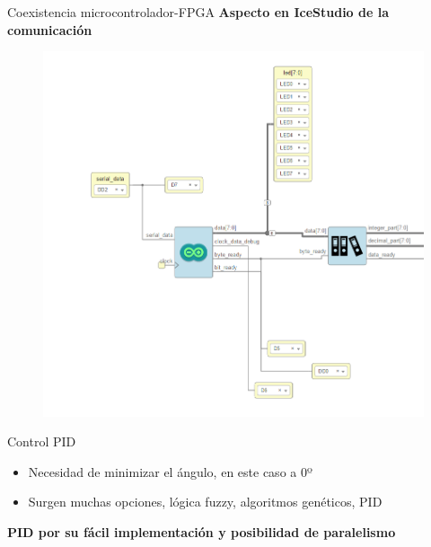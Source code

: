 \documentclass{beamer}
\begin{document}
\begin{frame}{Coexistencia microcontrolador-FPGA}
\centering \textbf{Aspecto en IceStudio de la comunicación}
\begin{figure}[H]
	\center
	\includegraphics[scale=0.3]{imagenes/Balancing_robot/arduino_arrange.PNG}
\end{figure}
\end{frame}





\begin{frame}{Control PID}
\begin{block}{}
	\begin{itemize}
		\item Necesidad de minimizar el ángulo, en este caso a 0º \pause
		\item Surgen muchas opciones, lógica fuzzy, algoritmos genéticos, PID \pause
	\end{itemize}
\end{block}
\begin{alertblock}
	\centering \textbf{PID por su fácil implementación y posibilidad de paralelismo}
\end{alertblock}
\end{frame}
\end{document}
